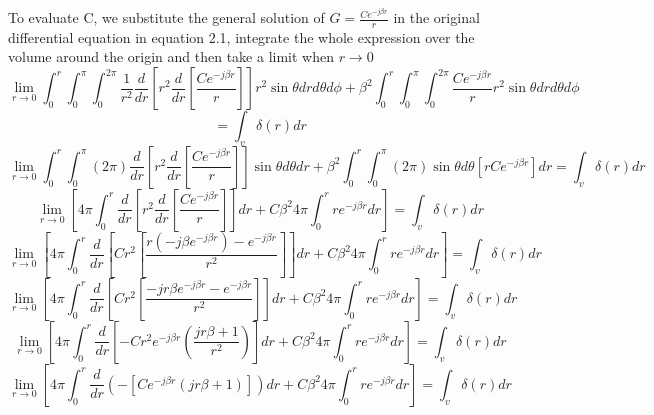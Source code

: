 To evaluate C, we substitute the general solution of $G = \frac{Ce^{-j\beta r}}{r}$ in the original differential equation in equation 2.1, integrate the whole expression over the volume around the origin and then take a limit when $r\rightarrow0$
\begin{dmath*}
\lim\limits_{r\rightarrow0} \int_{0}^{r} \int_{0}^{\pi}\int_{0}^{2\pi}\frac{1}{r^{2}}\frac{d}{dr}\left[{r^{2}}\frac{d}{dr}\left[\frac{Ce^{-j\beta r}}{r}\right]\right]r^{2}\sin\theta dr d\theta d\phi + \beta^{2} \int_{0}^{r} \int_{0}^{\pi}\int_{0}^{2\pi}\frac{Ce^{-j\beta r}}{r}r^{2}\sin\theta drd\theta d\phi
\end{dmath*}
$$= \int_{v}\delta(r)dr$$
\begin{dmath*}
\lim\limits_{r\rightarrow0} \int_{0}^{r} \int_{0}^{\pi}(2\pi)\frac{d}{dr}\left[{r^{2}}\frac{d}{dr}\left[\frac{Ce^{-j\beta r}}{r}\right]\right]\sin\theta d\theta dr + \beta^{2} \int_{0}^{r} \int_{0}^{\pi}(2\pi)\sin\theta d\theta[rCe^{-j\beta r}]dr = \int_{v}\delta(r)dr
\end{dmath*}
\begin{dmath*}
\lim\limits_{r\rightarrow0} \left[4\pi\int_{0}^{r}\frac{d}{dr}\left[{r^{2}}\frac{d}{dr}\left[\frac{Ce^{-j\beta r}}{r}\right]\right]dr + C\beta^{2}4\pi\int_{0}^{r}re^{-j\beta r}dr\right] = \int_{v}\delta(r)dr
\end{dmath*}
\begin{dmath*}
\lim\limits_{r\rightarrow0} \left[4\pi\int_{0}^{r}\frac{d}{dr}\left[{Cr^{2}}\left[\frac{r(-j\beta e^{-j\beta r}) - e^{-j\beta r}}{r^{2}}\right]\right]dr + C\beta^{2}4\pi\int_{0}^{r}re^{-j\beta r}dr\right] = \int_{v}\delta(r)dr
\end{dmath*}
\begin{dmath*}
\lim\limits_{r\rightarrow0} \left[4\pi\int_{0}^{r}\frac{d}{dr}\left[{Cr^{2}}\left[\frac{-jr\beta e^{-j\beta r} - e^{-j\beta r}}{r^{2}}\right]\right]dr + C\beta^{2}4\pi\int_{0}^{r}re^{-j\beta r}dr\right] = \int_{v}\delta(r)dr
\end{dmath*}
\begin{dmath*}
\lim\limits_{r\rightarrow0} \left[4\pi\int_{0}^{r}\frac{d}{dr}\left[{-Cr^{2}} e^{-j\beta r}\left(\frac{jr\beta+1}{r^{2}}\right)\right]dr + C\beta^{2}4\pi\int_{0}^{r}re^{-j\beta r}dr\right] = \int_{v}\delta(r)dr
\end{dmath*}
\begin{dmath*}
\lim\limits_{r\rightarrow0} \left[4\pi\int_{0}^{r}\frac{d}{dr}\left(-[{C} e^{-j\beta r}(jr\beta+1)]\right)dr + C\beta^{2}4\pi\int_{0}^{r}re^{-j\beta r}dr\right] = \int_{v}\delta(r)dr
\end{dmath*}
